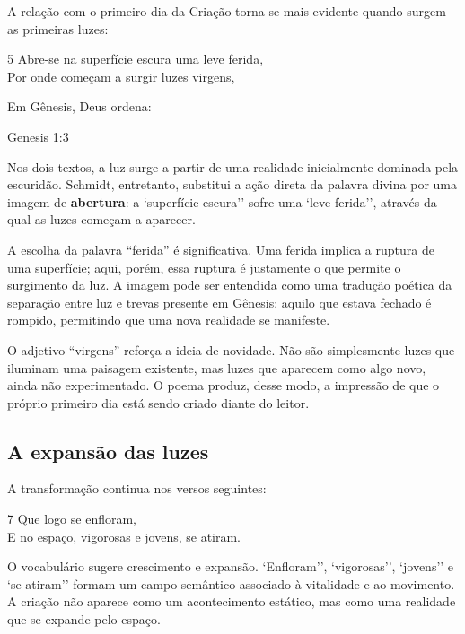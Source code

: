 A relação com o primeiro dia da Criação torna-se mais evidente quando surgem as
primeiras luzes:

\begin{poemquote}[0.49\textwidth]{5}
Abre-se na superfície escura uma leve ferida, \\
Por onde começam a surgir luzes virgens,
\end{poemquote}

Em Gênesis, Deus ordena:

\begin{biblequote}[0.6\textwidth][3]{Genesis 1:3}
\end{biblequote}

Nos dois textos, a luz surge a partir de uma realidade inicialmente dominada
pela escuridão. Schmidt, entretanto, substitui a ação direta da palavra divina
por uma imagem de \textbf{abertura}: a `superfície escura'' sofre uma `leve
ferida'', através da qual as luzes começam a aparecer.

A escolha da palavra ``ferida'' é significativa. Uma ferida implica a ruptura
de uma superfície; aqui, porém, essa ruptura é justamente o que permite o
surgimento da luz. A imagem pode ser entendida como uma tradução poética da
separação entre luz e trevas presente em Gênesis: aquilo que estava fechado é
rompido, permitindo que uma nova realidade se manifeste.

O adjetivo ``virgens'' reforça a ideia de novidade. Não são simplesmente luzes
que iluminam uma paisagem existente, mas luzes que aparecem como algo novo,
ainda não experimentado. O poema produz, desse modo, a impressão de que o
próprio primeiro dia está sendo criado diante do leitor.

\subsection{A expansão das luzes}

A transformação continua nos versos seguintes:

\begin{poemquote}[0.49\textwidth]{7}
Que logo se enfloram, \\
E no espaço, vigorosas e jovens, se atiram.
\end{poemquote}

O vocabulário sugere crescimento e expansão. `Enfloram'', `vigorosas'',
`jovens'' e `se atiram'' formam um campo semântico associado à vitalidade e
ao movimento. A criação não aparece como um acontecimento estático, mas como
uma realidade que se expande pelo espaço.


